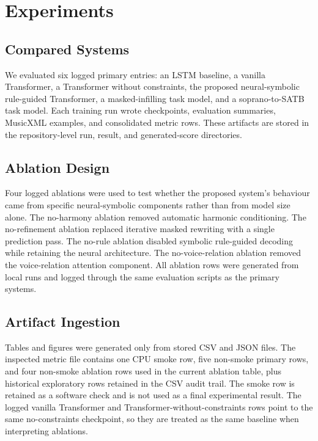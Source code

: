 \section{Experiments}

\subsection{Compared Systems}

We evaluated six logged primary entries: an LSTM baseline, a vanilla Transformer, a Transformer without constraints, the proposed neural-symbolic rule-guided Transformer, a masked-infilling task model, and a soprano-to-SATB task model. Each training run wrote checkpoints, evaluation summaries, MusicXML examples, and consolidated metric rows. These artifacts are stored in the repository-level run, result, and generated-score directories.

\subsection{Ablation Design}

Four logged ablations were used to test whether the proposed system's behaviour came from specific neural-symbolic components rather than from model size alone. The no-harmony ablation removed automatic harmonic conditioning. The no-refinement ablation replaced iterative masked rewriting with a single prediction pass. The no-rule ablation disabled symbolic rule-guided decoding while retaining the neural architecture. The no-voice-relation ablation removed the voice-relation attention component. All ablation rows were generated from local runs and logged through the same evaluation scripts as the primary systems.

\subsection{Artifact Ingestion}

Tables and figures were generated only from stored CSV and JSON files. The inspected metric file contains one CPU smoke row, five non-smoke primary rows, and four non-smoke ablation rows used in the current ablation table, plus historical exploratory rows retained in the CSV audit trail. The smoke row is retained as a software check and is not used as a final experimental result. The logged vanilla Transformer and Transformer-without-constraints rows point to the same no-constraints checkpoint, so they are treated as the same baseline when interpreting ablations.

